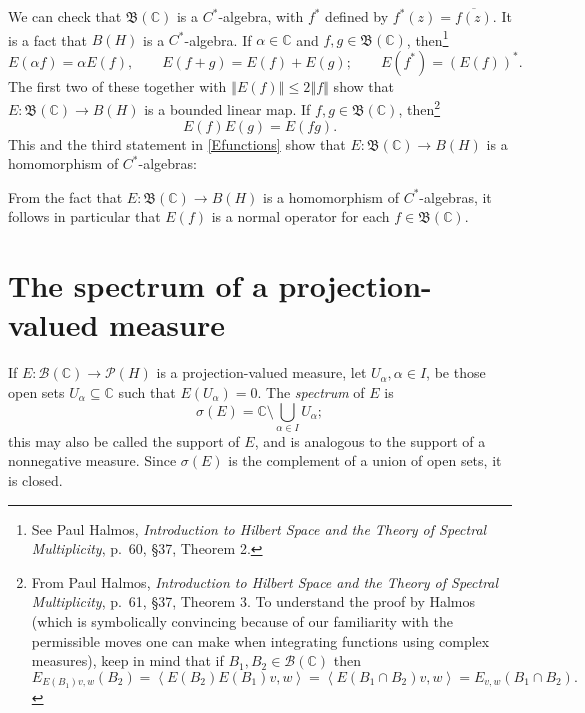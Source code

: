 \documentclass{article}
\newcommand{\inner}[2]{\left\langle #1, #2 \right\rangle}
\newcommand{\norm}[1]{\left\Vert #1 \right\Vert}
\begin{document}
We can  check that $\mathfrak{B}(\mathbb{C})$ is a $C^*$-algebra, with $f^*$ defined by $f^*(z)= \overline{f(z)}$. It is a fact that $B(H)$ is a $C^*$-algebra. If $\alpha \in \mathbb{C}$ and $f,g \in 
\mathfrak{B}(\mathbb{C})$,  then\footnote{See Paul Halmos, {\em Introduction to Hilbert Space and the Theory of Spectral Multiplicity},
p.~60, \S 37, Theorem 2.}
\begin{equation}
E(\alpha f)=\alpha E(f), \qquad E(f+g)=E(f)+E(g); \qquad E(f^*)=(E(f))^*.
\label{Efunctions}
\end{equation}
The first two of these together with $\norm{E(f)} \leq 2\norm{f}$ show that $E:\mathfrak{B}(\mathbb{C}) \to B(H)$ is a bounded linear map.
If $f, g \in \mathfrak{B}(\mathbb{C})$, then\footnote{From Paul Halmos, {\em Introduction to Hilbert Space and the Theory of Spectral Multiplicity},
p.~61, \S 37, Theorem 3. To understand the proof by Halmos (which is symbolically convincing because of our familiarity with the permissible  moves
one can make when
integrating functions using complex measures), keep in mind that if $B_1,B_2 \in \mathscr{B}(\mathbb{C})$ then
\[
E_{E(B_1)v,w}(B_2)=\inner{E(B_2)E(B_1)v}{w}=\inner{E(B_1 \cap B_2)v}{w}=E_{v,w}(B_1 \cap B_2).
\]
}
\[
E(f)E(g)=E(fg).
\]
This and the third statement in \eqref{Efunctions}
show that $E:\mathfrak{B}(\mathbb{C}) \to B(H)$ is a homomorphism of $C^*$-algebras:

From the fact that $E:\mathfrak{B}(\mathbb{C}) \to B(H)$ is a homomorphism of $C^*$-algebras, it follows in particular that 
$E(f)$ is a normal operator for each $f \in \mathfrak{B}(\mathbb{C})$. 

\section{The spectrum of a projection-valued measure}
If $E:\mathscr{B}(\mathbb{C}) \to \mathscr{P}(H)$ is a projection-valued measure,
let $U_\alpha, \alpha \in I$, be those open sets $U_\alpha \subseteq \mathbb{C}$ such that $E(U_\alpha)=0$. The
 {\em spectrum}
of $E$ is
\[
\sigma(E) = \mathbb{C} \setminus \bigcup_{\alpha \in I} U_\alpha;
\]
this may also be called the support of $E$, and is analogous to the support of a nonnegative measure. 
Since $\sigma(E)$ is the complement of a union of open sets, it is closed. 
\end{document}
